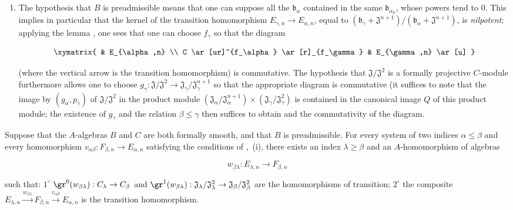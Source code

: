 \begin{env}[19.5.6.4]
\begin{enumerate}
  \item[\rm(ii)] The hypothesis that $B$ is preadmissible means that one can suppose all the $\mathfrak{b}_\alpha$ contained in the same $\mathfrak{b}_{\alpha_0}$, whose powers tend to $0$.
  This implies in particular that the kernel of the transition homomorphism $E_{\gamma,n}\to E_{\alpha,n}$, equal to $(\mathfrak{b}_\gamma+\mathfrak{J}^{n+1})/(\mathfrak{b}_\alpha+\mathfrak{J}^{n+1})$, is \emph{nilpotent};
  applying the lemma , one sees that one can choose $f_\gamma$ so that the diagram
  
\[
\xymatrix{
      & E_{\alpha,n} \\
      C \ar[ur]^{f_\alpha} \ar[r]_{f_\gamma} & E_{\gamma,n} \ar[u]
    }
\]

  (where the vertical arrow is the transition homomorphism) is commutative.
  The hypothesis that $\mathfrak{J}/\mathfrak{J}^2$ is a formally projective $C$-module furthermore allows one to choose $g_\gamma:\mathfrak{J}/\mathfrak{J}^2\to\mathfrak{J}_\gamma/\mathfrak{J}_\gamma^{n+1}$ so that the appropriate diagram is commutative (it suffices to note that the image by $(g_\alpha,p_\gamma)$ of $\mathfrak{J}/\mathfrak{J}^2$ in the product module $(\mathfrak{J}_\alpha/\mathfrak{J}_\alpha^{n+1})\times(\mathfrak{J}_\gamma/\mathfrak{J}_\gamma^2)$ is contained in the canonical image $Q$ of this product module;
  the existence of $g_\gamma$ and the relation $\beta\leq\gamma$ then suffices to obtain  and the commutativity of the diagram.
\end{enumerate}
\end{env}

\begin{lemma}[19.5.6.5]
\label{0.19.5.6.5}
Suppose that the $A$-algebras $B$ and $C$ are both formally smooth, and that $B$ is preadmissible.
For every system of two indices $\alpha\leq\beta$ and every homomorphism $v_{\alpha\beta}:F_{\beta,n}\to E_{\alpha,n}$ satisfying the conditions of ,~{\rm(i)}, there exists an index $\lambda\geq\beta$ and an $A$-homomorphism of algebras

\[
w_{\beta\lambda}:E_{\lambda,n}\to F_{\beta,n}
\]

such that: $1^\circ$ $\gr^0(w_{\beta\lambda}):C_\lambda\to C_\beta$ and $\gr^1(w_{\beta\lambda}):\mathfrak{J}_\lambda/\mathfrak{J}_\lambda^2\to\mathfrak{J}_\beta/\mathfrak{J}_\beta^2$ are the homomorphisms of transition;
$2^\circ$ the composite $E_{\lambda,n}\xrightarrow{w_{\beta\lambda}}F_{\beta,n}\xrightarrow{v_{\alpha\beta}}E_{\alpha,n}$ is the transition homomorphism.
\end{lemma}

